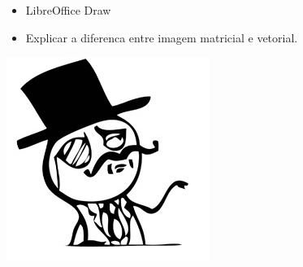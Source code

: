 \begin{multicols}{2}
	\begin{itemize}
	\item LibreOffice Draw
	\item Explicar a diferenca entre imagem matricial e vetorial.
\end{itemize}
\end{multicols}

\begin{multicols}{8}
	
\begin{center}
\includegraphics[width=\linewidth]{./IMG-GIT/MEMES/Meme-cara-caballero.jpg}
\end{center}


\end{multicols}
